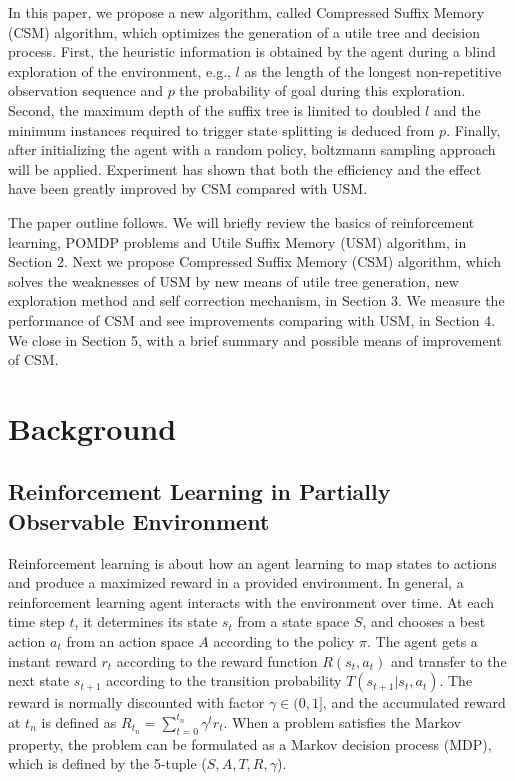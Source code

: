 \documentclass{article}
\begin{document}
In this paper, we propose a new algorithm, called Compressed Suffix Memory (CSM)
algorithm, which optimizes the generation of a utile tree and decision process.
First, the heuristic information is obtained by the agent during a blind exploration
of the environment, e.g., $l$ as the length of the longest non-repetitive observation
sequence and $p$ the probability of goal during this exploration. Second, the maximum
depth of the suffix tree is limited to doubled $l$ and the minimum instances required
to trigger state splitting is deduced from $p$. Finally, after initializing the agent
with a random policy, boltzmann sampling approach will be applied. Experiment has shown
that both the efficiency and the effect have been greatly improved by CSM compared
with USM.

The paper outline follows. We will briefly review the basics of reinforcement
learning, POMDP problems and Utile Suffix Memory (USM) algorithm, in Section 2.
Next we propose Compressed Suffix Memory (CSM) algorithm, which solves the weaknesses
of USM by new means of utile tree generation, new exploration method and self correction
mechanism, in Section 3. We measure the performance of CSM and see improvements comparing
with USM, in Section 4. We close in Section 5, with a brief summary and possible means of
improvement of CSM.

\section{Background}

\subsection{Reinforcement Learning in Partially Observable Environment}

Reinforcement learning is about how an agent learning to map states to actions
and produce a maximized reward in a provided environment. In general, a
reinforcement learning agent interacts with the environment over time.
At each time step $t$, it determines its state $s_t$ from a state space $S$,
and chooses a best action $a_t$ from an action space $A$ according to the policy
$\pi$. The agent gets a instant reward $r_t$ according to the reward function
$R(s_t, a_t)$ and transfer to the next state $s_{t+1}$ according to the transition
probability $T(s_{t+1}|s_t, a_t)$. The reward is normally discounted with factor
$\gamma\in(0,1]$, and the   accumulated reward at $t_n$ is defined as
$R_{t_n}=\sum_{t=0}^{t_n} \gamma^t r_t$. When a problem satisfies the Markov
property, the problem can be formulated as a Markov decision process (MDP), which
is defined by the 5-tuple ($S, A, T, R, \gamma$).
\end{document}
